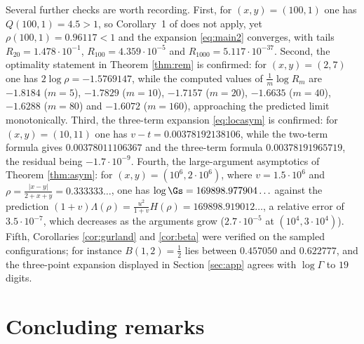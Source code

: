 Several further checks are worth recording. First, for $(x,y)=(100,1)$ one has
$Q(100,1)=4.5>1$, so Corollary~1 of \cite{Wisniewska25} does not apply, yet
$\rho(100,1)=0.96117<1$ and the expansion \eqref{eq:main2} converges, with tails
$R_{20}=1.478\cdot10^{-1}$, $R_{100}=4.359\cdot10^{-5}$ and
$R_{1000}=5.117\cdot10^{-37}$. Second, the optimality statement in Theorem \ref{thm:rem}
is confirmed: for $(x,y)=(2,7)$ one has $2\log\rho=-1.5769147$, while the computed values of
$\frac1m\log R_m$ are $-1.8184$ ($m=5$), $-1.7829$ ($m=10$), $-1.7157$ ($m=20$),
$-1.6635$ ($m=40$), $-1.6288$ ($m=80$) and $-1.6072$ ($m=160$), approaching the predicted
limit monotonically. Third, the three-term expansion \eqref{eq:locasym} is confirmed: for
$(x,y)=(10,11)$ one has $v-t=0.00378192138106$, while the two-term formula gives
$0.00378011106367$ and the three-term formula $0.00378191965719$, the residual being
$-1.7\cdot10^{-9}$. Fourth, the large-argument asymptotics of Theorem \ref{thm:asym}: for
$(x,y)=(10^{6},2\cdot10^{6})$, where $v=1.5\cdot10^{6}$ and
$\rho=\frac{|x-y|}{2+x+y}=0.333333\ldots$, one has $\log\Gs=169898.977904\ldots$ against the
prediction $(1+v)\Lambda(\rho)=\frac{u^{2}}{1+v}H(\rho)=169898.919012\ldots$, a relative
error of
$3.5\cdot10^{-7}$, which decreases as the arguments grow ($2.7\cdot10^{-5}$ at
$(10^{4},3\cdot10^{4})$). Fifth, Corollaries \ref{cor:gurland} and \ref{cor:beta} were
verified on the sampled configurations; for instance $B(1,2)=\frac12$ lies between
$0.457050$ and $0.622777$, and the three-point expansion displayed in
Section \ref{sec:app} agrees with $\log\Gamma$ to $19$ digits.

\section{Concluding remarks}

